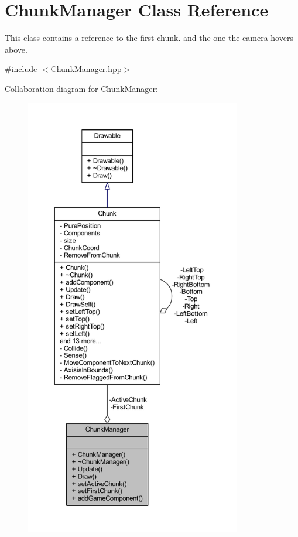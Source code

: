\hypertarget{class_chunk_manager}{\section{Chunk\-Manager Class Reference}
\label{class_chunk_manager}
}


This class contains a reference to the first chunk. and the one the camera hovers above.  




{\ttfamily \#include $<$Chunk\-Manager.\-hpp$>$}



Collaboration diagram for Chunk\-Manager\-:\nopagebreak
\begin{figure}[H]
\begin{center}
\leavevmode
\includegraphics[height=550pt]{class_chunk_manager__coll__graph}
\end{center}
\end{figure}
